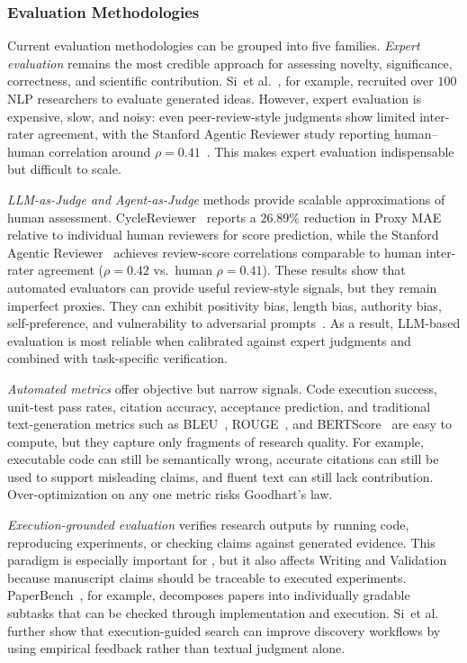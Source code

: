 \documentclass{llmxive}
\providecommand{\etal}{et al.\xspace}
\providecommand{\levelbadge}[2]{  \tcbox[on line, nobeforeafter, tcbox raise base,
         boxsep=0pt, left=2pt, right=2pt, top=0.5pt, bottom=0.5pt,
         arc=1.5pt, boxrule=0.3pt,
         colback=#1!15, colframe=#1!70]    {\scriptsize\bfseries\sffamily#2}}
\providecommand{\Sthree}{\texorpdfstring{\levelbadge{S3color}{S3}}{S3}\xspace}
\begin{document}
\subsubsection{Evaluation Methodologies}
\label{sec:eval_methods}

Current evaluation methodologies can be grouped into five families. \emph{Expert evaluation} remains the most credible approach for assessing novelty, significance, correctness, and scientific contribution. Si~\etal~\cite{si2024ideas}, for example, recruited over $100$ NLP researchers to evaluate generated ideas. However, expert evaluation is expensive, slow, and noisy: even peer-review-style judgments show limited inter-rater agreement, with the Stanford Agentic Reviewer study reporting human--human correlation around $\rho=0.41$~\cite{stanfordreviewer2025}. This makes expert evaluation indispensable but difficult to scale.

\emph{LLM-as-Judge and Agent-as-Judge} methods provide scalable approximations of human assessment. CycleReviewer~\cite{cycleresearcher2024} reports a $26.89\%$ reduction in Proxy MAE relative to individual human reviewers for score prediction, while the Stanford Agentic Reviewer~\cite{stanfordreviewer2025} achieves review-score correlations comparable to human inter-rater agreement ($\rho=0.42$ vs.\ human $\rho=0.41$). These results show that automated evaluators can provide useful review-style signals, but they remain imperfect proxies. They can exhibit positivity bias, length bias, authority bias, self-preference, and vulnerability to adversarial prompts~\cite{llmreviewer2025,ye2024llmjudgebias}. As a result, LLM-based evaluation is most reliable when calibrated against expert judgments and combined with task-specific verification.

\emph{Automated metrics} offer objective but narrow signals. Code execution success, unit-test pass rates, citation accuracy, acceptance prediction, and traditional text-generation metrics such as BLEU~\cite{papineni2002bleu}, ROUGE~\cite{lin2004rouge}, and BERTScore~\cite{zhang2020bertscore} are easy to compute, but they capture only fragments of research quality. For example, executable code can still be semantically wrong, accurate citations can still be used to support misleading claims, and fluent text can still lack contribution. Over-optimization on any one metric risks Goodhart's law.

\emph{Execution-grounded evaluation} verifies research outputs by running code, reproducing experiments, or checking claims against generated evidence. This paradigm is especially important for \Sthree, but it also affects Writing and Validation because manuscript claims should be traceable to executed experiments. PaperBench~\cite{paperbench2025}, for example, decomposes papers into individually gradable subtasks that can be checked through implementation and execution. Si~\etal~\cite{si2026executiongrounded} further show that execution-guided search can improve discovery workflows by using empirical feedback rather than textual judgment alone.
\end{document}
